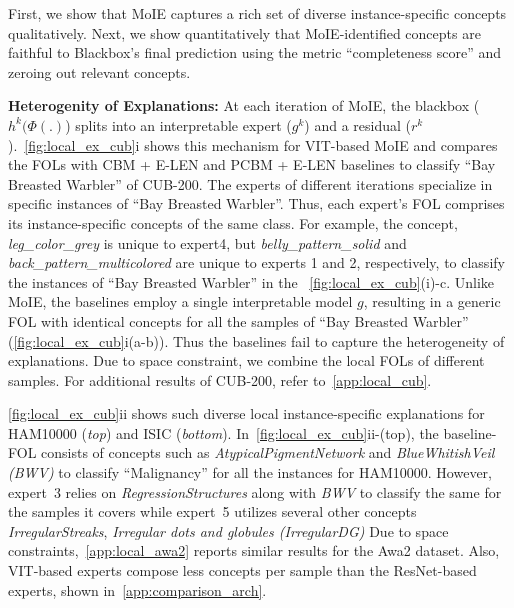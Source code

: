 
First, we show that MoIE captures a rich set of diverse instance-specific concepts qualitatively. Next, we show quantitatively that MoIE-identified concepts are faithful to Blackbox's final prediction using the metric ``completeness score'' and zeroing out relevant concepts.


\textbf{Heterogenity of Explanations:}
At each iteration of MoIE, the blackbox \big($h^k(\Phi(.)$\big) splits into an interpretable expert ($g^k$) and a residual ($r^k$).~\cref{fig:local_ex_cub}i shows this mechanism for VIT-based MoIE and compares the FOLs with CBM + E-LEN and PCBM + E-LEN baselines to classify ``Bay Breasted Warbler'' of CUB-200.
The experts of different iterations specialize in specific instances of ``Bay Breasted Warbler''. Thus, each expert's FOL comprises its instance-specific concepts of the same class. For example, the concept, \emph{leg\_color\_grey} is unique to expert4, but \emph{belly\_pattern\_solid} and \emph{back\_pattern\_multicolored} are unique to experts 1 and 2, respectively, to classify the instances of ``Bay Breasted Warbler'' in the ~\cref{fig:local_ex_cub}(i)-c. 
Unlike MoIE, the baselines employ a single interpretable model $g$, resulting in a generic FOL with identical concepts for all the samples of ``Bay Breasted Warbler'' (\cref{fig:local_ex_cub}i(a-b)). Thus the baselines fail to capture the heterogeneity of explanations. Due to space constraint, we combine the local FOLs of different samples. For additional results of CUB-200, refer to~\cref{app:local_cub}.

\cref{fig:local_ex_cub}ii shows such diverse local instance-specific explanations for HAM10000 (\emph{top}) and ISIC (\emph{bottom}). In~\cref{fig:local_ex_cub}ii-(top), the baseline-FOL consists of concepts such as \emph{AtypicalPigmentNetwork} and \emph{BlueWhitishVeil (BWV)} to classify ``Malignancy'' for all the instances for HAM10000. However, expert~3 relies on \emph{RegressionStructures} along with \emph{BWV} to classify the same for the samples it covers while expert~5 utilizes several other concepts \eg \emph{IrregularStreaks}, \emph{Irregular dots and globules (IrregularDG)} \etc \text{ }Due to space constraints,~\cref{app:local_awa2} reports similar results for the Awa2 dataset. Also, VIT-based experts compose less concepts per sample than the ResNet-based experts, shown in~\cref{app:comparison_arch}.

